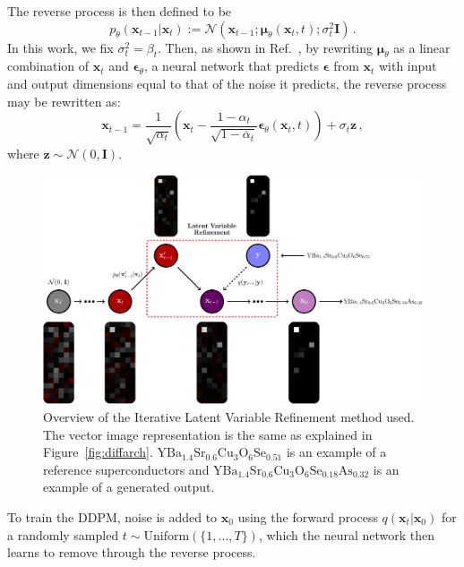 \documentclass[%
reprint,
 amsmath,amssymb,
 aps,
prb,
]{revtex4-2}
\begin{document}
The reverse process is then defined to be
\begin{equation}
    p_{\theta}(\mathbf{x}_{t-1} | \mathbf{x}_t) :=  \mathcal{N}(\mathbf{x}_{t-1}; \bm{\mu}_{\theta}(\mathbf{x}_t, t); \sigma_{t}^2\mathbf{I})\, .
\end{equation}
In this work, we fix $\sigma_{t}^2 = \beta_t$. Then, as shown in Ref.~\cite{ho2020denoising}, by rewriting $\bm{\mu}_{\theta}$ as a linear combination of $\mathbf{x}_t$ and $\bm{\epsilon}_\theta$, a neural network that predicts $\bm{\epsilon}$ from $\mathbf{x}_t$ with input and output dimensions equal to that of the noise it predicts, the reverse process may be rewritten as:
\begin{equation}
    \mathbf{x}_{t-1} = \frac{1}{\sqrt{\alpha_t}} \left( \mathbf{x}_t - \frac{1 - \alpha_t}{\sqrt{1 - \overline{\alpha}_t}}\bm{\epsilon}_\theta(\mathbf{x}_t,t)\right) + \sigma_t\mathbf{z}\, ,
\end{equation}
where $\mathbf{z} \sim \mathcal{N}(0, \mathbf{I})$. 


\begin{figure}
        \centering
        \includegraphics[width = 16cm]{newilvr2.png}
        \caption{Overview of the Iterative Latent Variable Refinement \cite{choi2021ilvr} method used. The vector image representation is the same as explained in Figure~\ref{fig:diffarch}. $\mathrm{YBa_{1.4}Sr_{0.6}Cu_{3}O_{6}Se_{0.51}}$ \cite{grinenko2023extraordinary} is an example of a reference superconductors and $\mathrm{YBa_{1.4}Sr_{0.6}Cu_{3}O_{6}Se_{0.18}As_{0.32}}$ is an example of a generated output.}
        \label{fig:ilvroverview}
\end{figure}

To train the DDPM, noise is added to $\mathbf{x}_0$ using the forward process $q(\mathbf{x}_t | \mathbf{x}_{0})$ for a randomly sampled $t \sim \text{Uniform}(\{1, ..., T\})$, which the neural network then learns to remove through the reverse process. 
\end{document}
